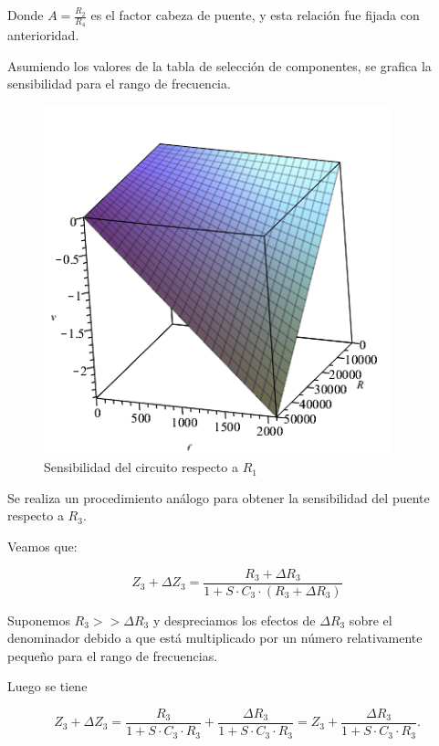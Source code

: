 Donde $A = \frac{R_2}{R_4}$ es el factor cabeza de puente, y esta relaci\'on fue fijada con anterioridad. 

Asumiendo los valores de la tabla de selecci\'on de componentes, se grafica la sensibilidad para el rango de frecuencia.

\begin{figure}[H]
    \centering
    \includegraphics[width=0.9\textwidth]{Recursos/sensib_R1.png}
	\caption{Sensibilidad del circuito respecto a $R_1$}
   	\label{fig:sensib_R1}
\end{figure}

Se realiza un procedimiento an\'alogo para obtener la sensibilidad del puente respecto a $R_3$.

Veamos que:

\begin{equation}
Z_3 + \Delta Z_3 = \frac{R_3 + \Delta R_3}{1+S \cdot C_3 \cdot (R_3 + \Delta R_3)} 
\end{equation}

Suponemos $R_3 >> \Delta R_3$ y despreciamos los efectos de $\Delta R_3$ sobre el denominador debido a que est\'a multiplicado por un n\'umero relativamente peque\~no para el rango de frecuencias.

Luego se tiene

\begin{equation}
Z_3 + \Delta Z_3 = \frac{R_3}{1+S \cdot C_3 \cdot R_3} + \frac{\Delta R_3}{1+S \cdot C_3 \cdot R_3} = Z_3 + \frac{\Delta R_3}{1+S \cdot C_3 \cdot R_3}.
\end{equation}

